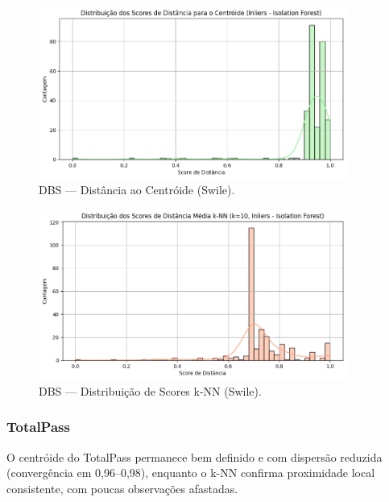 \begin{figure}[H]
    \centering
    \includegraphics[width=0.9\textwidth]{imagens/swile_centroid.png}
    \caption{DBS — Distância ao Centróide (Swile).}
    \label{fig:swile_centroid}
\end{figure}

\begin{figure}[H]
    \centering
    \includegraphics[width=0.9\textwidth]{imagens/swile_knn.png}
    \caption{DBS — Distribuição de Scores k-NN (Swile).}
    \label{fig:swile_knn}
\end{figure}

\subsubsection*{TotalPass}
\noindent
O centróide do TotalPass permanece bem definido e com dispersão reduzida (convergência em 0,96–0,98), enquanto o k-NN confirma proximidade local consistente, com poucas observações afastadas.

